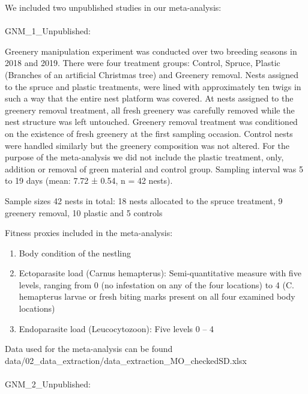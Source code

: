 \documentclass[
  number,
  review,
  onecolumn]{elsarticle}
\makeatletter
\let\oldparagraph\paragraph
\renewcommand{\paragraph}{
    \@ifstar
      \xxxParagraphStar
      \xxxParagraphNoStar
  }
\newcommand{\xxxParagraphStar}[1]{\oldparagraph*{#1}\mbox{}}
\newcommand{\xxxParagraphNoStar}[1]{\oldparagraph{#1}\mbox{}}
\makeatother
\begin{document}
We included two unpublished studies in our meta-analysis:

\paragraph{GNM\_1\_Unpublished:}\label{gnm_1_unpublished}

Greenery manipulation experiment was conducted over two breeding seasons
in 2018 and 2019. There were four treatment groups: Control, Spruce,
Plastic (Branches of an artificial Christmas tree) and Greenery removal.
Nests assigned to the spruce and plastic treatments, were lined with
approximately ten twigs in such a way that the entire nest platform was
covered. At nests assigned to the greenery removal treatment, all fresh
greenery was carefully removed while the nest structure was left
untouched. Greenery removal treatment was conditioned on the existence
of fresh greenery at the first sampling occasion. Control nests were
handled similarly but the greenery composition was not altered. For the
purpose of the meta-analysis we did not include the plastic treatment,
only, addition or removal of green material and control group. Sampling
interval was 5 to 19 days (mean: 7.72 ± 0.54, n = 42 nests).

Sample sizes 42 nests in total: 18 nests allocated to the spruce
treatment, 9 greenery removal, 10 plastic and 5 controls

Fitness proxies included in the meta-analysis:

\begin{enumerate}
\def\labelenumi{\arabic{enumi}.}
\item
  Body condition of the nestling
\item
  Ectoparasite load (Carnus hemapterus): Semi-quantitative measure with
  five levels, ranging from 0 (no infestation on any of the four
  locations) to 4 (C. hemapterus larvae or fresh biting marks present on
  all four examined body locations)
\item
  Endoparasite load (Leucocytozoon): Five levels 0 -- 4
\end{enumerate}

Data used for the meta-analysis can be found
data/02\_data\_extraction/data\_extraction\_MO\_checkedSD.xlsx\\

\paragraph{GNM\_2\_Unpublished:}\label{gnm_2_unpublished}
\end{document}

